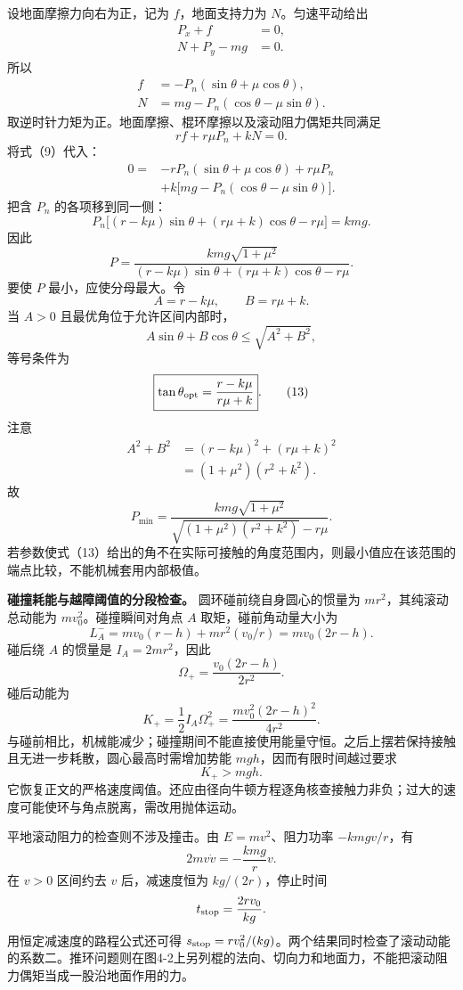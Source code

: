 \documentclass[12pt,a4paper,UTF8]{ctexart}
\begin{document}
设地面摩擦力向右为正，记为 \(f\)，地面支持力为 \(N\)。匀速平动给出 \[
\begin{aligned}
P_x+f&=0,\\
N+P_y-mg&=0.
\end{aligned}
\] 所以 \[
\begin{aligned}
f&=-P_n(\sin\theta+\mu\cos\theta),\\
N&=mg-P_n(\cos\theta-\mu\sin\theta).
\end{aligned} \tag{9}
\] 取逆时针力矩为正。地面摩擦、棍环摩擦以及滚动阻力偶矩共同满足 \[
rf+r\mu P_n+kN=0. \tag{10}
\] 将式（9）代入： \[
\begin{aligned}
0={}&-rP_n(\sin\theta+\mu\cos\theta)
+r\mu P_n\\
&+k\big[mg-P_n(\cos\theta-\mu\sin\theta)\big].
\end{aligned}
\] 把含 \(P_n\) 的各项移到同一侧： \[
P_n\big[
(r-k\mu)\sin\theta
+(r\mu+k)\cos\theta-r\mu
\big]=kmg. \tag{11}
\] 因此 \[
P=\frac{kmg\sqrt{1+\mu^2}}
{(r-k\mu)\sin\theta+(r\mu+k)\cos\theta-r\mu}. \tag{12}
\] 要使 \(P\) 最小，应使分母最大。令 \[
A=r-k\mu,\qquad B=r\mu+k.
\] 当 \(A>0\) 且最优角位于允许区间内部时， \[
A\sin\theta+B\cos\theta
\le\sqrt{A^2+B^2},
\] 等号条件为 \[
\boxed{
\tan\theta_{\rm opt}=\frac{r-k\mu}{r\mu+k}
}. \tag{13}
\] 注意 \[
\begin{aligned}
A^2+B^2
&=(r-k\mu)^2+(r\mu+k)^2\\
&=(1+\mu^2)(r^2+k^2).
\end{aligned}
\] 故 \[
\boxed{
P_{\min}
=\frac{kmg\sqrt{1+\mu^2}}
{\sqrt{(1+\mu^2)(r^2+k^2)}-r\mu}
}. \tag{14}
\]
若参数使式（13）给出的角不在实际可接触的角度范围内，则最小值应在该范围的端点比较，不能机械套用内部极值。

\textbf{碰撞耗能与越障阈值的分段检查。} 圆环碰前绕自身圆心的惯量为
\(mr^2\)，其纯滚动总动能为 \(mv_0^2\)。碰撞瞬间对角点 \(A\)
取矩，碰前角动量大小为 \[
L_A^-=mv_0(r-h)+mr^2(v_0/r)=mv_0(2r-h).
\] 碰后绕 \(A\) 的惯量是 \(I_A=2mr^2\)，因此 \[
\Omega_+=\frac{v_0(2r-h)}{2r^2}.
\] 碰后动能为 \[
K_+=\frac12I_A\Omega_+^2
=\frac{mv_0^2(2r-h)^2}{4r^2}.
\]
与碰前相比，机械能减少；碰撞期间不能直接使用能量守恒。之后上摆若保持接触且无进一步耗散，圆心最高时需增加势能
\(mgh\)，因而有限时间越过要求 \[
K_+>mgh.
\]
它恢复正文的严格速度阈值。还应由径向牛顿方程逐角核查接触力非负；过大的速度可能使环与角点脱离，需改用抛体运动。

平地滚动阻力的检查则不涉及撞击。由 \(E=mv^2\)、阻力功率 \(-kmgv/r\)，有
\[
2mv\dot v=-\frac{kmg}{r}v.
\] 在 \(v>0\) 区间约去 \(v\) 后，减速度恒为 \(kg/(2r)\)，停止时间 \[
t_{\rm stop}=\frac{2rv_0}{kg}.
\] 用恒定减速度的路程公式还可得
\(s_{\rm stop}=rv_0^2/(kg)\)。两个结果同时检查了滚动动能的系数二。推环问题则在图4-2上另列棍的法向、切向力和地面力，不能把滚动阻力偶矩当成一股沿地面作用的力。
\end{document}
